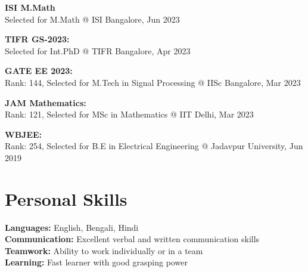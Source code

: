 \documentclass[a4paper,10pt]{article}
\begin{document}
\textbf{ISI M.Math}  \\
Selected for M.Math @ ISI Bangalore, Jun 2023 

\textbf{TIFR GS-2023:} \\
Selected for Int.PhD @ TIFR Bangalore, Apr 2023 

\textbf{GATE EE 2023:} \\
Rank: 144, Selected for M.Tech in Signal Processing @ IISc Bangalore, Mar 2023

\textbf{JAM Mathematics:} \\
Rank: 121, Selected for MSc in Mathematics @ IIT Delhi, Mar 2023 

\textbf{WBJEE:} \\
Rank: 254, Selected for B.E in Electrical Engineering @ Jadavpur University, Jun 2019


\section*{Personal Skills}
\textbf{Languages:} English, Bengali, Hindi \\
\textbf{Communication:} Excellent verbal and written communication skills \\
\textbf{Teamwork:} Ability to work individually or in a team \\
\textbf{Learning:} Fast learner with good grasping power
\end{document}
